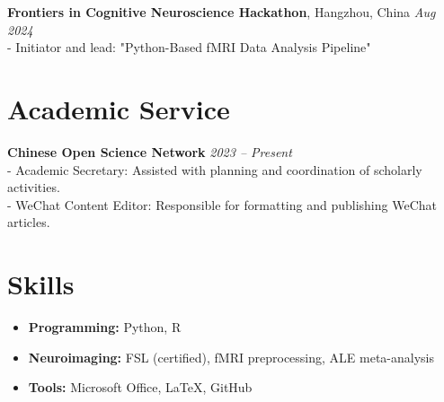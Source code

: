 \documentclass[a4paper,10pt]{article}
\begin{document}
\noindent
\textbf{Frontiers in Cognitive Neuroscience Hackathon}, Hangzhou, China \hfill \textit{Aug 2024} \\
- Initiator and lead: "Python-Based fMRI Data Analysis Pipeline"

\section*{Academic Service}
\noindent
\textbf{Chinese Open Science Network} \hfill \textit{2023 -- Present} \\
- Academic Secretary: Assisted with planning and coordination of scholarly activities. \\
- WeChat Content Editor: Responsible for formatting and publishing WeChat articles.

\section*{Skills}
\begin{itemize}[left=0pt, label=--]
    \item \textbf{Programming:} Python, R
    \item \textbf{Neuroimaging:} FSL (certified), fMRI preprocessing, ALE meta-analysis
    \item \textbf{Tools:} Microsoft Office, LaTeX, GitHub
\end{itemize}
\end{document}
